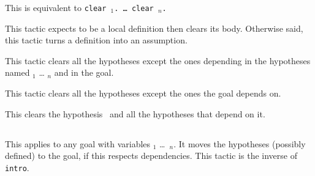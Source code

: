 \begin{Variants}

\item {}

  This is equivalent to {\tt clear {\ident$_1$}. {\ldots} clear
    {\ident$_n$}.}

\item {}

  This tactic expects {\ident} to be a local definition then clears
  its body. Otherwise said, this tactic turns a definition into an
  assumption.

  \ErrMsg {}

\item {}

  This tactic clears all the hypotheses except the ones depending in
  the hypotheses named {\ident$_1$} {\ldots} {\ident$_n$} and in the
  goal.

\item {}

  This tactic clears all the hypotheses except the ones the goal depends on.

\item {}

 This clears the hypothesis \ident\ and all the hypotheses
 that depend on it.

\end{Variants}

\subsection{}
\label{revert}

This applies to any goal with variables \ident$_1$ \dots\ \ident$_n$.
It moves the hypotheses (possibly defined) to the goal, if this respects
dependencies. This tactic is the inverse of {\tt intro}.

\begin{ErrMsgs}
\item {}
\item {}
\end{ErrMsgs}

